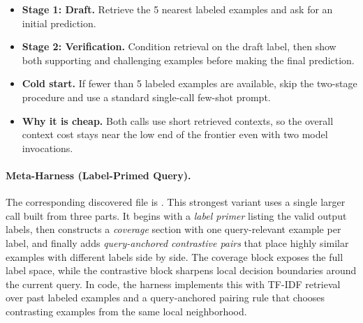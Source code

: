 \begin{itemize}[leftmargin=*]
\item \textbf{Stage 1: Draft.} Retrieve the 5 nearest labeled examples and ask for an initial prediction.
\item \textbf{Stage 2: Verification.} Condition retrieval on the draft label, then show both supporting and challenging examples before making the final prediction.
\item \textbf{Cold start.} If fewer than 5 labeled examples are available, skip the two-stage procedure and use a standard single-call few-shot prompt.
\item \textbf{Why it is cheap.} Both calls use short retrieved contexts, so the overall context cost stays near the low end of the frontier even with two model invocations.
\end{itemize}

\paragraph{Meta-Harness (Label-Primed Query).}
The corresponding discovered file is .
This strongest variant uses a single larger call built from three parts.
It begins with a \emph{label primer} listing the valid output labels, then constructs a \emph{coverage} section with one query-relevant example per label, and finally adds \emph{query-anchored contrastive pairs} that place highly similar examples with different labels side by side.
The coverage block exposes the full label space, while the contrastive block sharpens local decision boundaries around the current query.
In code, the harness implements this with TF-IDF retrieval over past labeled examples and a query-anchored pairing rule that chooses contrasting examples from the same local neighborhood.

